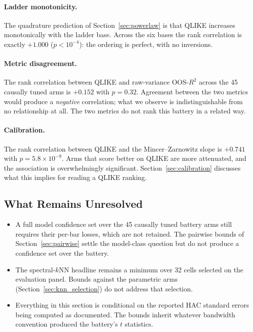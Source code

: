 \paragraph{Ladder monotonicity.} The quadrature prediction of
Section~\ref{sec:powerlaw} is that QLIKE increases monotonically with the
ladder base. Across the six bases the rank correlation is exactly $+1.000$
($p < 10^{-4}$): the ordering is perfect, with no inversions.

\paragraph{Metric disagreement.} The rank correlation between QLIKE and
raw-variance OOS-$R^2$ across the 45 causally tuned arms is $+0.152$ with
$p = 0.32$. Agreement between the two metrics would produce a \emph{negative}
correlation; what we observe is indistinguishable from no relationship at all.
The two metrics do not rank this battery in a related way.

\paragraph{Calibration.} The rank correlation between QLIKE and the
Mincer--Zarnowitz slope is $+0.741$ with $p = 5.8 \times 10^{-9}$. Arms that
score better on QLIKE are more attenuated, and the association is
overwhelmingly significant. Section~\ref{sec:calibration} discusses what this
implies for reading a QLIKE ranking.

\subsection{What Remains Unresolved}
\label{sec:inference_remaining}

\begin{itemize}
  \item A full model confidence set over the 45 causally tuned battery arms
    still requires their per-bar losses, which are not retained. The pairwise
    bounds of Section~\ref{sec:pairwise} settle the model-class question but do
    not produce a confidence set over the battery.
  \item The spectral-$k$NN headline remains a minimum over 32 cells selected on
    the evaluation panel. Bounds against the parametric arms
    (Section~\ref{sec:knn_selection}) do not address that selection.
  \item Everything in this section is conditional on the reported HAC standard
    errors being computed as documented. The bounds inherit whatever bandwidth
    convention produced the battery's $t$ statistics.
\end{itemize}
